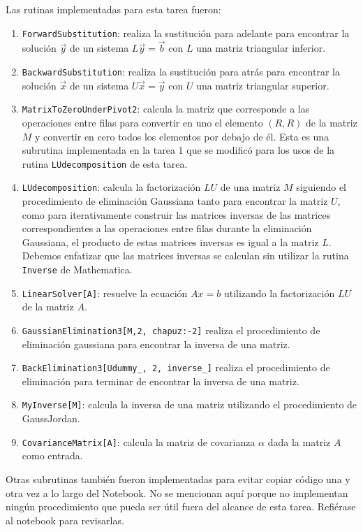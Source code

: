 \documentclass[11pt,letterpaper]{article}
\begin{document}
Las rutinas implementadas para esta tarea fueron:
\begin{enumerate}
\item \verb|ForwardSubstitution|: realiza la sustitución para adelante
para encontrar la solución $\vec y$ de un sistema $L\vec y=\vec b$ con
$L$ una matriz triangular inferior.
\item \verb|BackwardSubstitution|: realiza la sustitución para atrás
para encontrar la solución $\vec x$ de un sistema $U\vec x=\vec y$ con
$U$ una matriz triangular superior.
\item \verb|MatrixToZeroUnderPivot2|: calcula la matriz que corresponde
a las operaciones entre filas para convertir en uno el elemento $(R,R)$ de
la matriz $M$ y convertir en cero todos los elementos por debajo de él.
Esta es una subrutina implementada en la tarea 1 que se modificó para 
los usos de la rutina \verb|LUdecomposition| de esta tarea.
\item \verb|LUdecomposition|: calcula la factorización $LU$ de una matriz $M$
siguiendo el procedimiento de eliminación Gaussiana tanto para encontrar 
la matriz $U$, como para iterativamente construir las matrices inversas
de las matrices correspondientes a las operaciones entre filas durante
la eliminación Gaussiana, el producto de estas matrices inversas
es igual a la matriz $L$. Debemos enfatizar que las matrices inversas
se calculan sin utilizar la rutina \verb|Inverse| de Mathematica.
\item \verb|LinearSolver[A]|: resuelve la ecuación $Ax=b$ utilizando
la factorización $LU$ de la matriz $A$.
\item \verb|GaussianElimination3[M,2, chapuz:-2]| realiza el procedimiento
de eliminación gaussiana para encontrar la inversa de una matriz.
\item \verb|BackElimination3[Udummy_, 2, inverse_]| realiza el procedimiento
de eliminación para terminar de encontrar la inversa de una matriz.
\item \verb|MyInverse[M]|: calcula la inversa de una matriz utilizando
el procedimiento de GaussJordan.
\item \verb|CovarianceMatrix[A]|: calcula la matriz de covarianza $\alpha$
dada la matriz $A$ como entrada.
\end{enumerate}
Otras subrutinas también fueron implementadas para evitar copiar código
una y otra vez a lo largo del Notebook. No se mencionan aquí porque no 
implementan ningún procedimiento que pueda ser útil fuera del alcance de esta
tarea. Refiérase al notebook para revisarlas.
\end{document}

